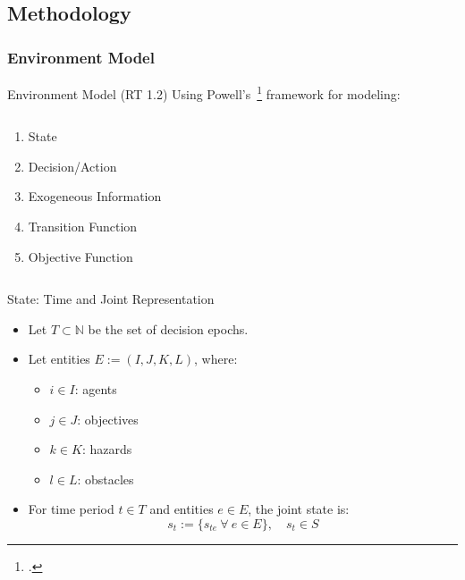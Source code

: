 \subsection{Methodology}

\subsubsection{Environment Model}

\begin{frame}{Environment Model (RT 1.2)}
    Using Powell's~\footcite{powell2022}
    framework for modeling:
    \begin{columns}
        \begin{column}{0.3\linewidth}
            \begin{enumerate}
                \item State
                \item Decision/Action
                \item Exogeneous Information
                \item Transition Function
                \item Objective Function
            \end{enumerate}
        \end{column}
        \begin{column}{0.7\linewidth}
        \end{column}
    \end{columns}
\end{frame}


\begin{frame}{State: Time and Joint Representation}
    \begin{itemize}
        \item Let \(T\subset\mathbb{N}\) be the set of decision epochs.
        \item Let entities \(E := (I, J, K, L)\), where:
        \begin{itemize}
            \item \(i\in I\): agents
            \item \(j\in J\): objectives
            \item \(k\in K\): hazards
            \item \(l\in L\): obstacles
        \end{itemize}
        \item For time period \(t\in T\) and entities \(e\in E\), the joint state is:
        \[
            s_t := \{s_{te}\ \forall\ e\in E\}, \quad s_t \in S
        \]
    \end{itemize}
\end{frame}

